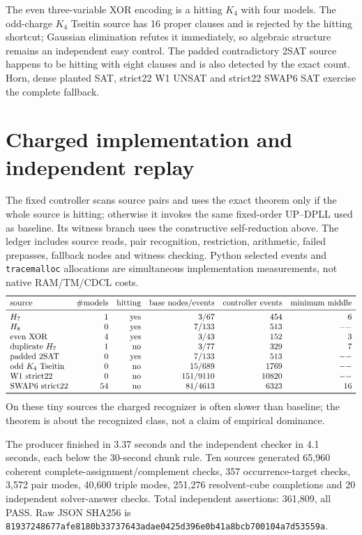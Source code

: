\documentclass[11pt]{article}
\begin{document}
The even three-variable XOR encoding is a hitting $K_4$ with four models.  The
odd-charge $K_4$ Tseitin source has 16 proper clauses and is rejected by the
hitting shortcut; Gaussian elimination refutes it immediately, so algebraic
structure remains an independent easy control.  The padded contradictory 2SAT
source happens to be hitting with eight clauses and is also detected by the exact
count.  Horn, dense planted SAT, strict22 W1 UNSAT and strict22 SWAP6 SAT exercise
the complete fallback.

\section{Charged implementation and independent replay}
The fixed controller scans source pairs and uses the exact theorem only if the
whole source is hitting; otherwise it invokes the same fixed-order UP--DPLL used
as baseline.  Its witness branch uses the constructive self-reduction above.  The
ledger includes source reads, pair recognition, restriction, arithmetic, failed
prepasses, fallback nodes and witness checking.  Python selected events and
\texttt{tracemalloc} allocations are simultaneous implementation measurements,
not native RAM/TM/CDCL costs.
\[
\begin{array}{lrrrrr}
\toprule
\text{source}&\#\text{models}&\text{hitting}&\text{base nodes/events}&
\text{controller events}&\text{minimum middle}\\\midrule
H_7&1&\text{yes}&3/67&454&6\\
H_8&0&\text{yes}&7/133&513&--\\
\text{even XOR}&4&\text{yes}&3/43&152&3\\
\text{duplicate }H_7&1&\text{no}&3/77&329&7\\
\text{padded 2SAT}&0&\text{yes}&7/133&513&--\\
\text{odd }K_4\text{ Tseitin}&0&\text{no}&15/689&1769&--\\
\text{W1 strict22}&0&\text{no}&151/9110&10820&--\\
\text{SWAP6 strict22}&54&\text{no}&81/4613&6323&16\\
\bottomrule
\end{array}
\]
On these tiny sources the charged recognizer is often slower than baseline; the
theorem is about the recognized class, not a claim of empirical dominance.

The producer finished in 3.37 seconds and the independent checker in 4.1 seconds,
each below the 30-second chunk rule.  Ten sources generated 65,960 coherent
complete-assignment/complement checks, 357 occurrence-target checks, 3,572 pair
modes, 40,600 triple modes, 251,276 resolvent-cube completions and 20 independent
solver-answer checks.  Total independent assertions: 361,809, all PASS.  Raw JSON
SHA256 is
\texttt{81937248677afe8180b33737643adae0425d396e0b41a8bcb700104a7d53559a}.
\end{document}
